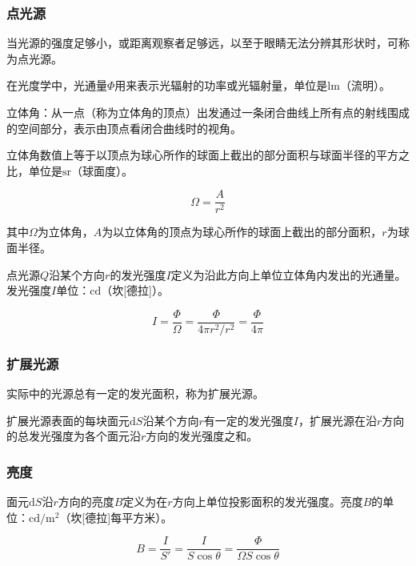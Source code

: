 \documentclass[cn, blue, normal, 12pt]{elegantnote}
\begin{document}
\subsubsection{点光源}

当光源的强度足够小，或距离观察者足够远，以至于眼睛无法分辨其形状时，可称为点光源。

在光度学中，光通量$\varPhi$用来表示光辐射的功率或光辐射量，单位是$\mathrm{lm}$（流明）。

立体角：从一点（称为立体角的顶点）出发通过一条闭合曲线上所有点的射线围成的空间部分，表示由顶点看闭合曲线时的视角。

立体角数值上等于以顶点为球心所作的球面上截出的部分面积与球面半径的平方之比，单位是$\mathrm{sr}$（球面度）。

\begin{equation}
    \varOmega=\frac{A}{r^2}
\end{equation}

其中$\varOmega$为立体角，$A$为以立体角的顶点为球心所作的球面上截出的部分面积，$r$为球面半径。

点光源$Q$沿某个方向$r$的发光强度$I$定义为沿此方向上单位立体角内发出的光通量。发光强度$I$单位：$\mathrm{cd}$（坎[德拉]）。

\begin{equation}
    I=\frac{\varPhi}{\varOmega}=\frac{\varPhi}{4\pi r^2/r^2}=\frac{\varPhi}{4\pi}
\end{equation}

\subsubsection{扩展光源}

实际中的光源总有一定的发光面积，称为扩展光源。

扩展光源表面的每块面元$\mathrm{d}S$沿某个方向$r$有一定的发光强度$I$，扩展光源在沿$r$方向的总发光强度为各个面元沿$r$方向的发光强度之和。

\subsubsection{亮度}

面元$\mathrm{d}S$沿$r$方向的亮度$B$定义为在$r$方向上单位投影面积的发光强度。亮度$B$的单位：$\mathrm{cd/m^2}$（坎[德拉]每平方米）。

\begin{equation}
    B=\frac{I}{S'}=\frac{I}{S\cos{\theta}}=\frac{\varPhi}{\varOmega S\cos{\theta}}
\end{equation}
\end{document}
